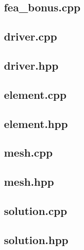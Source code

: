 \documentclass[a4paper, 12pt]{article}
\begin{document}
\subsection{fea\_bonus.cpp} \label{subsec:fea_bonus.cpp}


\subsection{driver.cpp} \label{subsec:driver.cpp}

\subsection{driver.hpp} \label{subsec:driver.hpp}


\subsection{element.cpp} \label{subsec:element.cpp}

\subsection{element.hpp} \label{subsec:element.hpp}


\subsection{mesh.cpp} \label{subsec:mesh.cpp}

\subsection{mesh.hpp} \label{subsec:mesh.hpp}


\subsection{solution.cpp} \label{subsec:solution.cpp}

\subsection{solution.hpp} \label{subsec:solution.hpp}

\end{document}
